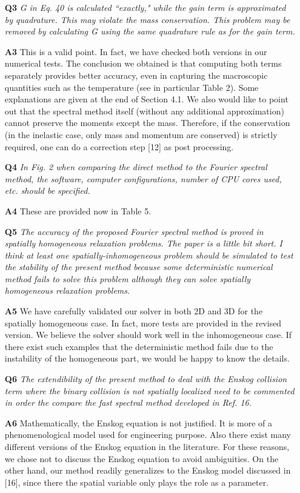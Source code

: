 \documentclass[11pt]{article}
\begin{document}
\begin{itemize}
\item[{\bf Q3}] {\it G in Eq. 40 is calculated ``exactly," while the gain term is approximated by quadrature. This may violate the mass conservation. This problem may be removed by calculating G using the same quadrature rule as for the gain term.
}

\item[{\bf A3}] This is a valid point. In fact, we have checked both versions in our numerical tests. The conclusion we obtained is that computing both terms separately provides better accuracy, even in capturing the macroscopic quantities such as the temperature (see in particular Table 2). Some explanations are given at the end of Section 4.1. We also would like to point out that the spectral method itself (without any additional approximation) cannot preserve the moments except the mass. Therefore, if the conservation (in the inelastic case, only mass and momentum are conserved) is strictly required, one can do a correction step [12] as post processing.


\item[{\bf Q4}] {\it In Fig. 2 when comparing the direct method to the Fourier spectral method, the software, computer configurations, number of CPU cores used, etc. should be specified.  }

\item[{\bf A4}] These are provided now in Table 5.


\item[{\bf Q5}] {\it The accuracy of the proposed Fourier spectral method is proved in spatially homogeneous relaxation problems. The paper is a little bit short. I think at least one spatially-inhomogeneous problem should be simulated to test the stability of the present method because some deterministic numerical method fails to solve this problem although they can solve spatially homogeneous relaxation problems. }

\item[{\bf A5}] We have carefully validated our solver in both 2D and 3D for the spatially homogeneous case. In fact, more tests are provided in the revised version. We believe the solver should work well in the inhomogeneous case. If there exist such examples that the deterministic method fails due to the instability of the homogeneous part, we would be happy to know the details.

\item[{\bf Q6}] {\it The extendibility of the present method to deal with the Enskog collision term where the binary collision is not spatially localized need to be commented in order the compare the fast spectral method developed in Ref. 16. }

\item[{\bf A6}] Mathematically, the Enskog equation is not justified. It is more of a phenomenological model used for engineering purpose. Also there exist many different versions of the Enskog equation in the literature. For these reasons, we chose not to discuss the Enskog equation to avoid ambiguities. On the other hand, our method readily generalizes to the Enskog model discussed in [16], since there the spatial variable only plays the role as a parameter. 
\end{itemize}
\end{document}

